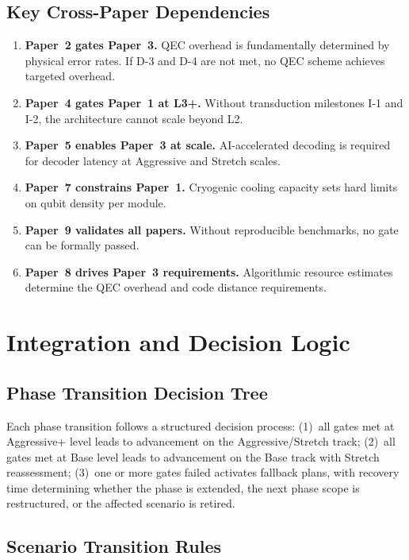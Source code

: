 \documentclass[conference]{IEEEtran}
\begin{document}
\subsection{Key Cross-Paper Dependencies}

\begin{enumerate}[leftmargin=*]
\item \textbf{Paper~2 gates Paper~3.} QEC overhead is fundamentally determined by physical error rates. If D-3 and D-4 are not met, no QEC scheme achieves targeted overhead.
\item \textbf{Paper~4 gates Paper~1 at L3+.} Without transduction milestones I-1 and I-2, the architecture cannot scale beyond L2.
\item \textbf{Paper~5 enables Paper~3 at scale.} AI-accelerated decoding is required for decoder latency at Aggressive and Stretch scales.
\item \textbf{Paper~7 constrains Paper~1.} Cryogenic cooling capacity sets hard limits on qubit density per module.
\item \textbf{Paper~9 validates all papers.} Without reproducible benchmarks, no gate can be formally passed.
\item \textbf{Paper~8 drives Paper~3 requirements.} Algorithmic resource estimates determine the QEC overhead and code distance requirements.
\end{enumerate}

\section{Integration and Decision Logic}

\subsection{Phase Transition Decision Tree}

Each phase transition follows a structured decision process: (1)~all gates met at Aggressive+ level leads to advancement on the Aggressive/Stretch track; (2)~all gates met at Base level leads to advancement on the Base track with Stretch reassessment; (3)~one or more gates failed activates fallback plans, with recovery time determining whether the phase is extended, the next phase scope is restructured, or the affected scenario is retired.

\subsection{Scenario Transition Rules}
\end{document}
